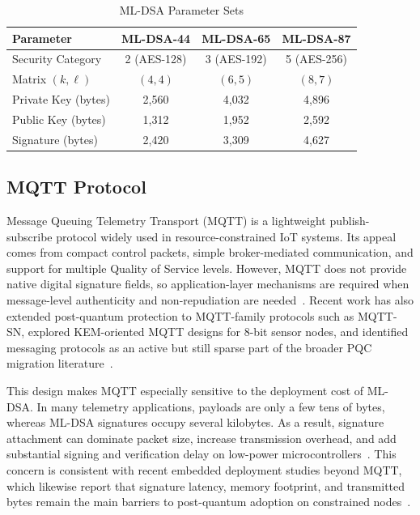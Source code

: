 \documentclass[final, twoside]{IEEEtran} %
\begin{document}
\begin{table}[h]
	\centering
	\caption{ML-DSA Parameter Sets}
	\label{tab:mldsa-params}
	\begin{tabular}{lccc}
		\toprule
		\textbf{Parameter}  & \textbf{ML-DSA-44} & \textbf{ML-DSA-65} & \textbf{ML-DSA-87} \\
		\midrule
		Security Category   & 2 (AES-128)        & 3 (AES-192)        & 5 (AES-256)        \\
		Matrix $(k,\ell)$   & $(4,4)$            & $(6,5)$            & $(8,7)$            \\
		Private Key (bytes) & 2,560              & 4,032              & 4,896              \\
		Public Key (bytes)  & 1,312              & 1,952              & 2,592              \\
		Signature (bytes)   & 2,420              & 3,309              & 4,627              \\
		\bottomrule
	\end{tabular}
\end{table}

\subsection{MQTT Protocol}

Message Queuing Telemetry Transport (MQTT) is a lightweight publish-subscribe protocol widely used in resource-constrained IoT systems. Its appeal comes from compact control packets, simple broker-mediated communication, and support for multiple Quality of Service levels. However, MQTT does not provide native digital signature fields, so application-layer mechanisms are required when message-level authenticity and non-repudiation are needed~\cite{Samandari2023,Rampazzo2023}. Recent work has also extended post-quantum protection to MQTT-family protocols such as MQTT-SN, explored KEM-oriented MQTT designs for 8-bit sensor nodes, and identified messaging protocols as an active but still sparse part of the broader PQC migration literature~\cite{BlancoRomero2024,Kim2025,Egbuagha2025}.

This design makes MQTT especially sensitive to the deployment cost of ML-DSA. In many telemetry applications, payloads are only a few tens of bytes, whereas ML-DSA signatures occupy several kilobytes. As a result, signature attachment can dominate packet size, increase transmission overhead, and add substantial signing and verification delay on low-power microcontrollers~\cite{Samandari2023,Rampazzo2023,Kim2025,BlancoRomero2024}. This concern is consistent with recent embedded deployment studies beyond MQTT, which likewise report that signature latency, memory footprint, and transmitted bytes remain the main barriers to post-quantum adoption on constrained nodes~\cite{Banegas2021,Marchsreiter2024,pqm4-benchmarks}.
\end{document}
